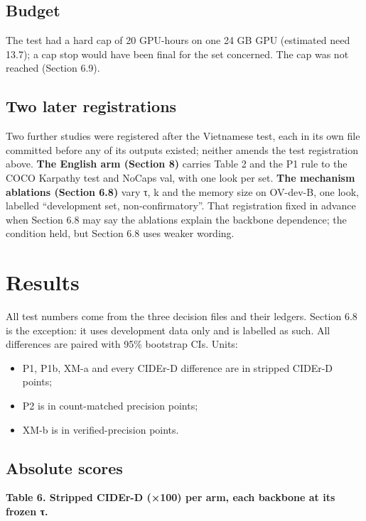 \subsection{Budget}\label{budget}

The test had a hard cap of 20 GPU-hours on one 24 GB GPU (estimated need 13.7); a cap stop would
have been final for the set concerned. The cap was not reached (Section 6.9).

\subsection{Two later registrations}\label{two-later-registrations}

Two further studies were registered after the Vietnamese test, each in its own file committed before
any of its outputs existed; neither amends the test registration above. \textbf{The English arm
(Section 8)} carries Table 2 and the P1 rule to the COCO Karpathy test and NoCaps val, with one look
per set. \textbf{The mechanism ablations (Section 6.8)} vary τ, k and the memory size on OV-dev-B,
one look, labelled ``development set, non-confirmatory''. That registration fixed in advance when
Section 6.8 may say the ablations explain the backbone dependence; the condition held, but Section
6.8 uses weaker wording.

\section{Results}\label{results}

All test numbers come from the three decision files and their ledgers. Section 6.8 is the exception:
it uses development data only and is labelled as such. All differences are paired with 95\%
bootstrap CIs. Units:

\begin{itemize}
\tightlist
\item
  P1, P1b, XM-a and every CIDEr-D difference are in stripped CIDEr-D points;
\item
  P2 is in count-matched precision points;
\item
  XM-b is in verified-precision points.
\end{itemize}

\subsection{Absolute scores}\label{absolute-scores}

\textbf{Table 6. Stripped CIDEr-D (×100) per arm, each backbone at its frozen τ.}

